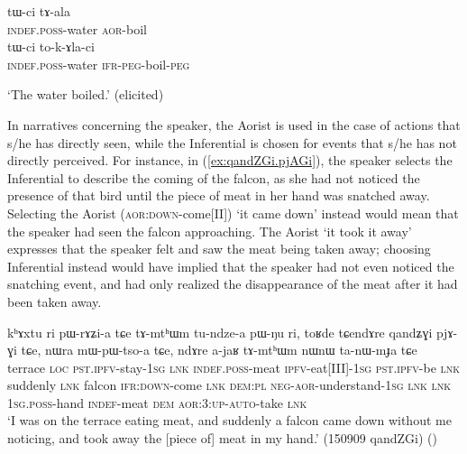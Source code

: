 \begin{exe}
\ex 
\begin{xlist}
\ex \label{ex:tWci.tala}
\gll tɯ-ci tɤ-ala \\
\textsc{indef}.\textsc{poss}-water \textsc{aor}-boil  \\
\ex \label{ex:tWci.tokAlaci}
\gll tɯ-ci to-k-ɤla-ci  \\
\textsc{indef}.\textsc{poss}-water \textsc{ifr}-\textsc{peg}-boil-\textsc{peg} \\
\end{xlist}
\glt `The water boiled.' (elicited)
\end{exe}

In narratives concerning the speaker, the Aorist is used in the case of actions that s/he has directly seen, while the Inferential is chosen for events that s/he has not directly perceived. For instance, in (\ref{ex:qandZGi.pjAGi}), the speaker selects the Inferential  to describe the coming of the falcon, as she had not noticed the presence of that bird until the piece of meat in her hand was snatched away. Selecting the Aorist  (\textsc{aor}:\textsc{down}-come[II]) `it came down' instead would mean that the speaker had seen the falcon approaching.  The Aorist  `it took it away' expresses that the speaker felt and saw the meat being taken away; choosing  Inferential  instead would have implied that the speaker had not even noticed the snatching event, and had only realized the disappearance of the meat after it had been taken away.


\begin{exe}
\ex \label{ex:qandZGi.pjAGi}
\gll   kʰɤxtu ri pɯ-rɤʑi-a tɕe tɤ-mtʰɯm tu-ndze-a pɯ-ŋu ri, toʁde tɕendɤre qandʑɣi pjɤ-ɣi tɕe, nɯra mɯ-pɯ-tso-a tɕe, ndɤre a-jaʁ tɤ-mtʰɯm nɯnɯ ta-nɯ-mɟa tɕe \\
terrace \textsc{loc} \textsc{pst}.\textsc{ipfv}-stay-\textsc{1sg} \textsc{lnk} \textsc{indef}.\textsc{poss}-meat \textsc{ipfv}-eat[III]-\textsc{1sg} \textsc{pst}.\textsc{ipfv}-be \textsc{lnk} suddenly \textsc{lnk} falcon \textsc{ifr}:\textsc{down}-come \textsc{lnk} \textsc{dem}:\textsc{pl} \textsc{neg}-\textsc{aor}-understand-\textsc{1sg} \textsc{lnk} \textsc{lnk} \textsc{1sg}.\textsc{poss}-hand \textsc{indef}-meat \textsc{dem} \textsc{aor}:3\flobv{}:\textsc{up}-\textsc{auto}-take \textsc{lnk} \\
\glt `I was on the terrace eating meat, and suddenly a falcon came down without me noticing, and took away the [piece of] meat in my hand.' (150909 qandZGi) ()
 \end{exe}



